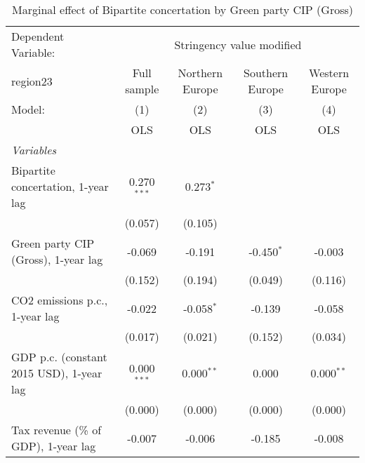 
\begin{table}[htbp]
   \caption{Marginal effect of Bipartite concertation by Green party CIP (Gross)}
   \centering
   \begin{tabular}{lcccc}
      \toprule
      Dependent Variable: & \multicolumn{4}{c}{Stringency value modified}\\
      region23                                                                 & Full sample   & Northern Europe & Southern Europe & Western Europe \\   
      Model:                                                                   & (1)           & (2)             & (3)             & (4)\\  
                                                                               &  OLS          & OLS             & OLS             & OLS\\  
      \midrule
      \emph{Variables}\\
      Bipartite concertation, 1-year lag                                       & 0.270$^{***}$ & 0.273$^{*}$     &                 &   \\   
                                                                               & (0.057)       & (0.105)         &                 &   \\   
      Green party CIP (Gross), 1-year lag                                      & -0.069        & -0.191          & -0.450$^{*}$    & -0.003\\   
                                                                               & (0.152)       & (0.194)         & (0.049)         & (0.116)\\   
      CO2 emissions p.c., 1-year lag                                           & -0.022        & -0.058$^{*}$    & -0.139          & -0.058\\   
                                                                               & (0.017)       & (0.021)         & (0.152)         & (0.034)\\   
      GDP p.c. (constant 2015 USD), 1-year lag                                 & 0.000$^{***}$ & 0.000$^{**}$    & 0.000           & 0.000$^{**}$\\   
                                                                               & (0.000)       & (0.000)         & (0.000)         & (0.000)\\   
      Tax revenue (\% of GDP), 1-year lag                                      & -0.007        & -0.006          & -0.185          & -0.008\\   

\end{tabular}
\end{table}
